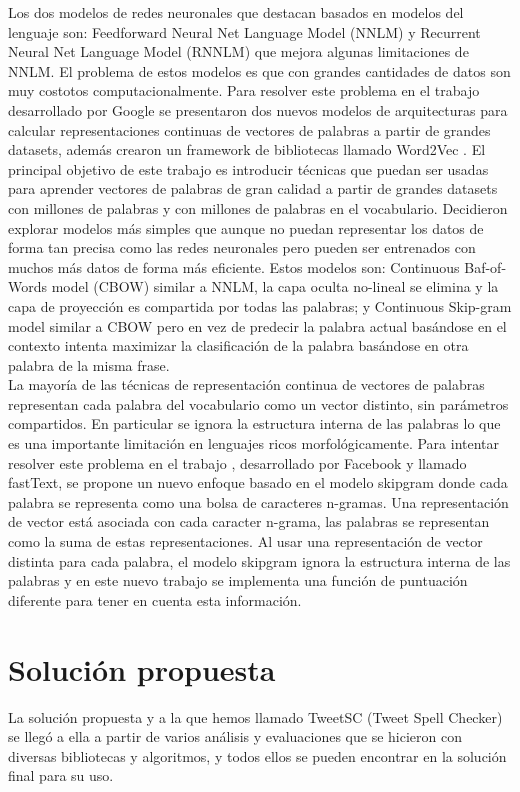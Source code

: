 \documentclass[spanish,12pt, a4paper,twoside]{paper}
\let\oldsection\section
\def\section{\cleardoublepage\oldsection}
\begin{document}
Los dos modelos de redes neuronales que destacan basados en modelos del lenguaje son: Feedforward Neural Net Language Model (NNLM) \cite{bengio:2003} y Recurrent Neural Net Language Model (RNNLM) que mejora algunas limitaciones de NNLM. El problema de estos modelos es que con grandes cantidades de datos son muy costotos computacionalmente. Para resolver este problema en el trabajo \cite{mikolov:2013} desarrollado por Google se presentaron dos nuevos modelos de arquitecturas para calcular representaciones continuas de vectores de palabras a partir de grandes datasets, además crearon un framework de bibliotecas llamado Word2Vec \cite{google:word2vec}. El principal objetivo de este trabajo es introducir técnicas que puedan ser usadas para aprender vectores de palabras de gran calidad a partir de grandes datasets con millones de palabras y con millones de palabras en el vocabulario. Decidieron explorar modelos más simples que aunque no puedan representar los datos de forma tan precisa como las redes neuronales pero pueden ser entrenados con muchos más datos de forma más eficiente. Estos modelos son: Continuous Baf-of-Words model (CBOW) similar a NNLM, la capa oculta no-lineal se elimina y la capa de proyección es compartida por todas las palabras; y Continuous Skip-gram model similar a CBOW pero en vez de predecir la palabra actual basándose en el contexto intenta maximizar la clasificación de la palabra basándose en otra palabra de la misma frase.\\

La mayoría de las técnicas de representación continua de vectores de palabras representan cada palabra del vocabulario como un vector distinto, sin parámetros compartidos. En particular se ignora la estructura interna de las palabras lo que es una importante limitación en lenguajes ricos morfológicamente. Para intentar resolver este problema en el trabajo \cite{bojanowski:2017}, desarrollado por Facebook \cite{facebook:fasttext} y llamado fastText, se propone un nuevo enfoque basado en el modelo skipgram \cite{mikolov:2013} donde cada palabra se representa como una bolsa de caracteres n-gramas. Una representación de vector está asociada con cada caracter n-grama, las palabras se representan como la suma de estas representaciones. Al usar una representación de vector distinta para cada palabra, el modelo skipgram ignora la estructura interna de las palabras y en este nuevo trabajo se implementa una función de puntuación diferente para tener en cuenta esta información.

\section{Solución propuesta}\label{sec:solucionpropuesta}
La solución propuesta y a la que hemos llamado TweetSC (Tweet Spell Checker) \cite{tweetscweb} se llegó a ella a partir de varios análisis y evaluaciones que se hicieron con diversas bibliotecas y algoritmos, y todos ellos se pueden encontrar en la solución final para su uso.\\
\end{document}
